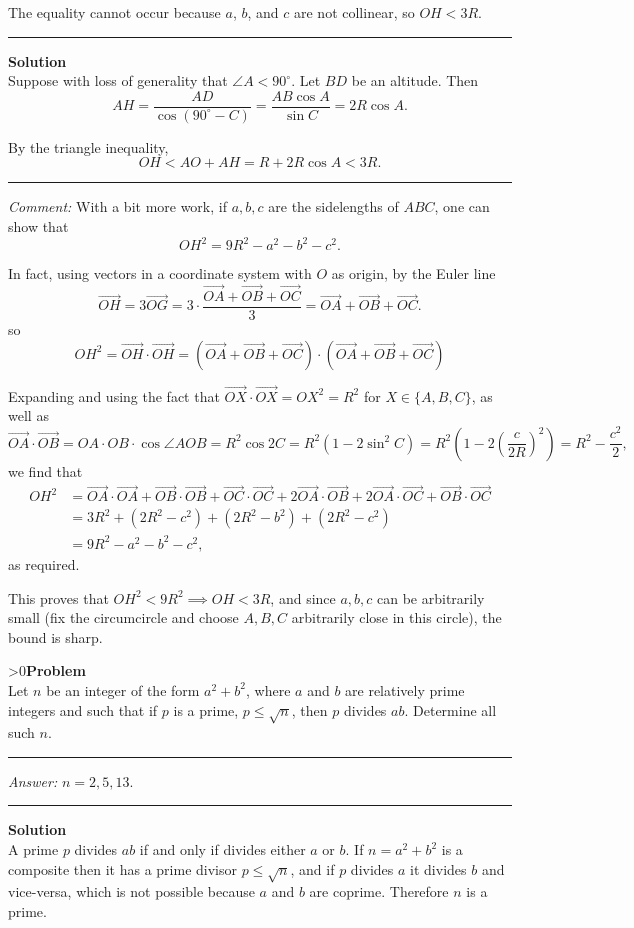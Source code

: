 \documentclass[12pt,oneside,a4paper]{book}
\newcounter{probnum}
\newcounter{solnum}
\newcommand{\prob}{\ifnum\value{probnum}>0\newpage\fi\setcounter{solnum}{0}\stepcounter{probnum}\textbf{Problem \theprobnum}\\}
\newcommand{\ans}{\medskip\hrule\medbreak\emph{Answer: }}
\newcommand{\comment}{\medskip\hrule\medbreak\emph{Comment: }}
\newcommand{\sol}{\medskip\hrule\medbreak\textbf{Solution}\\}
\newcommand{\soln}{\stepcounter{solnum}\medskip\hrule\medbreak\textbf{Solution \thesolnum}\\}
\begin{document}
The equality cannot occur because $a$, $b$, and $c$ are not collinear, so $OH < 3R$.

\soln
Suppose with loss of generality that $\angle A < 90^\circ$. Let $BD$ be an altitude. Then
\[AH = \frac{AD}{\cos(90^\circ-C)} = \frac{AB\cos A}{\sin C} = 2R\cos A.\]

By the triangle inequality,
\[OH < AO + AH = R + 2R\cos A < 3R.\]

\comment
With a bit more work, if $a,b,c$ are the sidelengths of $ABC$, one can show that
\[OH^2 = 9R^2 - a^2 - b^2 - c^2.\]

In fact, using vectors in a coordinate system with $O$ as origin, by the Euler line
\[\overrightarrow{OH} = 3\overrightarrow{OG} = 3\cdot \frac{\overrightarrow{OA} + \overrightarrow{OB} + \overrightarrow{OC}}3 = \overrightarrow{OA} + \overrightarrow{OB} + \overrightarrow{OC}.\]
so
\[OH^2 = \overrightarrow{OH}\cdot \overrightarrow{OH}
= (\overrightarrow{OA} + \overrightarrow{OB} + \overrightarrow{OC})\cdot(\overrightarrow{OA} + \overrightarrow{OB} + \overrightarrow{OC})\]

Expanding and using the fact that $\overrightarrow{OX}\cdot \overrightarrow{OX} = OX^2 = R^2$ for $X \in \{A,B,C\}$, as well as
\[\overrightarrow{OA}\cdot \overrightarrow{OB} = OA\cdot OB\cdot\cos\angle AOB = R^2\cos 2C = R^2(1-2\sin^2C) = R^2\left(1 - 2\left(\frac c{2R}\right)^2\right)
= R^2 - \frac{c^2}2,\]
we find that
\begin{align*}
OH^2 &= \overrightarrow{OA}\cdot \overrightarrow{OA} + \overrightarrow{OB}\cdot \overrightarrow{OB} + \overrightarrow{OC}\cdot \overrightarrow{OC}
+ 2\overrightarrow{OA}\cdot \overrightarrow{OB} + 2\overrightarrow{OA}\cdot \overrightarrow{OC} + \overrightarrow{OB}\cdot \overrightarrow{OC}\\
&= 3R^2 + (2R^2-c^2) + (2R^2-b^2) + (2R^2-c^2)\\
&= 9R^2 - a^2 - b^2 - c^2,
\end{align*}
as required.

This proves that $OH^2 < 9R^2\implies OH < 3R$, and since $a,b,c$ can be arbitrarily small (fix the circumcircle and choose $A,B,C$ arbitrarily close in this circle), the bound is sharp.

\prob Let $n$ be an integer of the form $a^2+b^2$, where $a$ and $b$ are relatively prime integers and such that if $p$ is a prime, $p\le \sqrt n$, then $p$ divides $ab$. Determine all such $n$.

\ans $n=2,5,13$.

\sol
A prime $p$ divides $ab$ if and only if divides either $a$ or $b$. If $n=a^2+b^2$ is a composite then it has a prime divisor $p\le \sqrt n$, and if $p$ divides $a$ it divides $b$ and vice-versa, which is not possible because $a$ and $b$ are coprime. Therefore $n$ is a prime.
\end{document}
